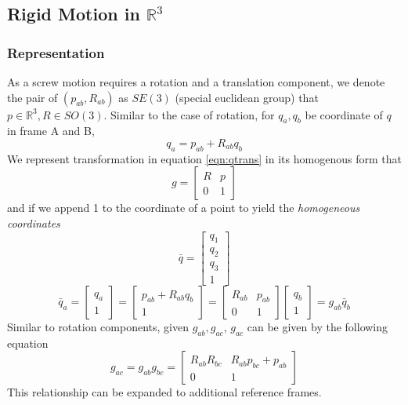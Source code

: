 \documentclass[letterpaper]{article}
\begin{document}
\subsection{Rigid Motion in $\mathbb{R}^3$}

\subsubsection{Representation}
As a screw motion requires a rotation and a translation component, we denote the pair of 
$(p_{ab}, R_{ab})$ as $SE(3)$ (special euclidean group) that $p\in \mathbb{R}^3, R\in SO(3)$.
Similar to the case of rotation, for $q_a, q_b$ be coordinate of $q$ in frame 
A and B, 
\begin{equation} \label{eqn:qtrans}
  {q}_a = p_{ab} + R_{ab}q_b
\end{equation}
We represent transformation in equation \ref{eqn:qtrans} in its homogenous form that
\begin{equation}
  g = \begin{bmatrix}
    R & p \\ 0 & 1
  \end{bmatrix}
\end{equation}
and if we append 1 to the coordinate of a point to yield the \emph{homogeneous coordinates}
\begin{equation}
  \bar{q} = \begin{bmatrix}
    q_1\\q_2\\q_3\\1
  \end{bmatrix}
\end{equation}
\begin{equation}
  \bar{q}_a = \begin{bmatrix} q_a\\1 \end{bmatrix}
   = \begin{bmatrix}
    p_{ab} + R_{ab}q_b\\
    1
   \end{bmatrix}
   = \begin{bmatrix} R_{ab} & p_{ab}\\0&1 \end{bmatrix}
  \begin{bmatrix}
    q_b \\ 1
  \end{bmatrix} = g_{ab}\bar{q}_b
\end{equation}
Similar to rotation components, given $g_{ab}, g_{ac}$, $g_{ac}$ can be given by the following equation
\begin{equation}
  g_{ac} = g_{ab} g_{bc} = \begin{bmatrix}
    R_{ab}R_{bc} & R_{ab}p_{bc} + p_{ab}\\0 & 1
  \end{bmatrix}
\end{equation}
This relationship can be expanded to additional reference frames. 
\end{document}
